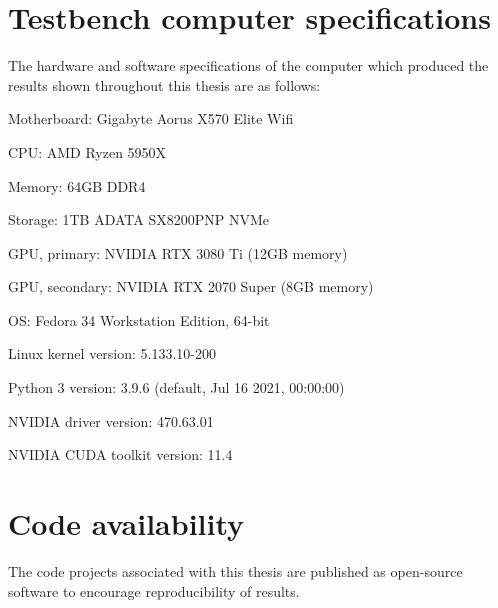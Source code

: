 \documentclass[report.tex]{subfiles}
\begin{document}
\begin{appendices}

\section{Testbench computer specifications}
\label{appendix:computerspec}

The hardware and software specifications of the computer which produced the results shown throughout this thesis are as follows:
\begin{tight_enumerate}
	\item
		Motherboard: Gigabyte Aorus X570 Elite Wifi
	\item
		CPU: AMD Ryzen 5950X
	\item
		Memory: 64GB DDR4
	\item
		Storage: 1TB ADATA SX8200PNP NVMe
	\item
		GPU, primary: NVIDIA RTX 3080 Ti (12GB memory)
	\item
		GPU, secondary: NVIDIA RTX 2070 Super (8GB memory)
	\item
		OS: Fedora 34 Workstation Edition, 64-bit
	\item
		Linux kernel version: 5.133.10-200
	\item
		Python 3 version: 3.9.6 (default, Jul 16 2021, 00:00:00)
	\item
		NVIDIA driver version: 470.63.01
	\item
		NVIDIA CUDA toolkit version: 11.4
\end{tight_enumerate}

\newpagefill

\section{Code availability}
\label{appendix:codeavail}

The code projects associated with this thesis are published as open-source software to encourage reproducibility of results.


\end{appendices}
\end{document}
